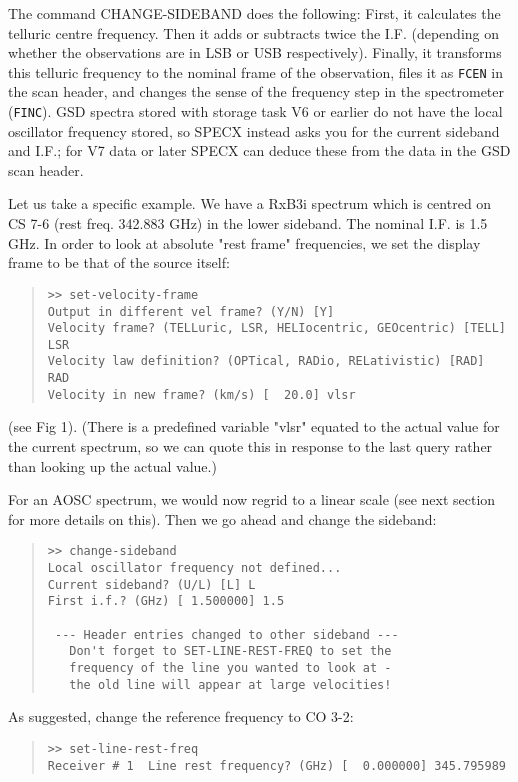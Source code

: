 \documentclass[twoside,11pt]{article}
\renewcommand{\_}{\texttt{\symbol{95}}}
\newenvironment{myquote}{\begin{quote}\begin{small}}{\end{small}\end{quote}}
\begin{document}
The command CHANGE-SIDEBAND does the following: First, it calculates the
telluric centre frequency. Then it adds or subtracts twice the I.F. (depending
on whether the observations are in LSB or USB respectively). Finally, it
transforms this telluric frequency to the nominal frame of the observation,
files it as \texttt{F\_CEN} in the scan header, and changes the sense of the
frequency step in the spectrometer (\texttt{F\_INC}). GSD spectra stored with
storage task V6 or earlier do not have the local oscillator frequency stored,
so SPECX instead asks you for the current sideband and I.F.; for V7 data or
later SPECX can deduce these from the data in the GSD scan header.

Let us take a specific example. We have a RxB3i spectrum which is centred on CS
7-6 (rest freq. 342.883 GHz) in the lower sideband.  The nominal I.F. is 1.5
GHz. In order to look at absolute "rest frame" frequencies, we set the display
frame to be that of the source itself:

\begin{myquote}
\begin{verbatim}
>> set-velocity-frame
Output in different vel frame? (Y/N) [Y]
Velocity frame? (TELLuric, LSR, HELIocentric, GEOcentric) [TELL] LSR
Velocity law definition? (OPTical, RADio, RELativistic) [RAD] RAD
Velocity in new frame? (km/s) [  20.0] vlsr
\end{verbatim}
\end{myquote}
(see Fig 1). (There is a predefined variable "vlsr" equated to the actual value
for the current spectrum, so we can quote this in response to the last query
rather than looking up the actual value.)

For an AOSC spectrum, we would now regrid to a linear scale (see next section
for more details on this). Then we go ahead and change the sideband:
\begin{myquote}
\begin{verbatim}
>> change-sideband
Local oscillator frequency not defined...
Current sideband? (U/L) [L] L
First i.f.? (GHz) [ 1.500000] 1.5

 --- Header entries changed to other sideband ---
   Don't forget to SET-LINE-REST-FREQ to set the
   frequency of the line you wanted to look at -
   the old line will appear at large velocities!
\end{verbatim}
\end{myquote}

As suggested, change the reference frequency to CO 3-2:
\begin{myquote}
\begin{verbatim}
>> set-line-rest-freq
Receiver # 1  Line rest frequency? (GHz) [  0.000000] 345.795989
\end{verbatim}
\end{myquote}
\end{document}
